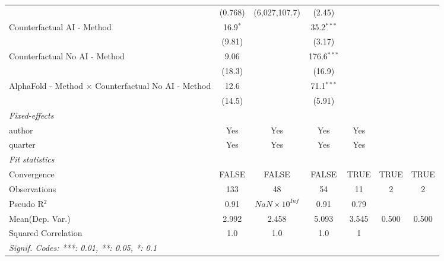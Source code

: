 \begin{tabular}{lcccccc}
                                                              & (0.768)      & (6,027,107.7)         & (2.45)        &         &      &   \\   
   Counterfactual AI - Method                                 & 16.9$^{*}$   &                       & 35.2$^{***}$  &         &      &   \\   
                                                              & (9.81)       &                       & (3.17)        &         &      &   \\   
   Counterfactual No AI - Method                              & 9.06         &                       & 176.6$^{***}$ &         &      &   \\   
                                                              & (18.3)       &                       & (16.9)        &         &      &   \\   
   AlphaFold - Method $\times$ Counterfactual No AI - Method  & 12.6         &                       & 71.1$^{***}$  &         &      &   \\   
                                                              & (14.5)       &                       & (5.91)        &         &      &   \\   
   \midrule
   \emph{Fixed-effects}\\
   author                                                     & Yes          & Yes                   & Yes           & Yes     &      & \\  
   quarter                                                    & Yes          & Yes                   & Yes           & Yes     &      & \\  
   \midrule
   \emph{Fit statistics}\\
   Convergence                                                &FALSE         & FALSE                 & FALSE         & TRUE    & TRUE & TRUE\\  
   Observations                                               & 133          & 48                    & 54            & 11      & 2    & 2\\  
   Pseudo R$^2$                                               & 0.91         & $NaN\times 10^{Inf}$  & 0.91          & 0.79    &      & \\  
Mean(Dep. Var.) & 2.992 & 2.458 & 5.093 & 3.545 & 0.500 & 0.500 \\
   Squared Correlation                                        & 1.0          & 1.0                   & 1.0           & 1       &      & \\  
   \midrule \midrule
   \multicolumn{7}{l}{\emph{Signif. Codes: ***: 0.01, **: 0.05, *: 0.1}}\\
\end{tabular}
\par\endgroup
